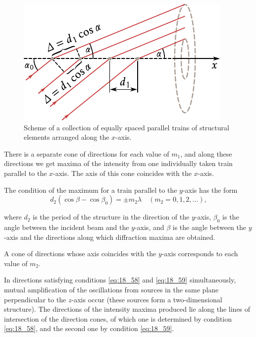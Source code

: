 \begin{figure}[!htb]
	\begin{center}
		\includegraphics[scale=1.0]{figures/ch_18/fig_18_41.pdf}
        \caption[]{Scheme of a collection of equally spaced parallel trains of structural elements arranged along the $x$-axis.}
		\label{fig:18_41}
	\end{center}
	\vspace{-0.8cm}
\end{figure}

There is a separate cone of directions for each value of $m_1$, and along these directions we get maxima of the intensity from one individually taken train parallel to the $x$-axis.
The axis of this cone coincides with the $x$-axis.

The condition of the maximum for a train parallel to the $y$-axis has the form
\begin{equation}\label{eq:18_59}
	d_2 (\cos\beta - \cos\beta_0) = \pm m_2 \lambda \quad (m_2=0,1,2,\ldots),
\end{equation}

\noindent
where $d_2$ is the period of the structure in the direction of the $y$-axis, $\beta_0$ is the angle between the incident beam and the $y$-axis, and $\beta$ is the angle between the $y$-axis and the directions along which diffraction maxima are obtained.

A cone of directions whose axis coincides with the $y$-axis corresponds to each value of $m_2$.

In directions satisfying conditions \eqref{eq:18_58} and \eqref{eq:18_59} simultaneously, mutual amplification of the oscillations from sources in the same plane perpendicular to the $z$-axis occur (these sources form a two-dimensional structure).
The directions of the intensity maxima produced lie along the lines of intersection of the direction cones, of which one is determined by condition \eqref{eq:18_58}, and the second one by condition \eqref{eq:18_59}.

